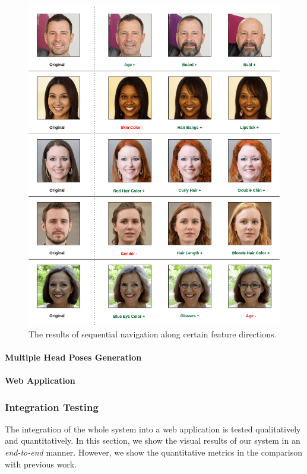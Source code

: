 \begin{figure}[H]
    \centering
    \includegraphics[width=\textwidth]{images/sequential-nav.png}
    \caption{The results of sequential navigation along certain feature directions.}
    \label{fig:nav_res}
\end{figure}

\paragraph{Multiple Head Poses Generation}

\paragraph{Web Application}

\subsubsection{Integration Testing}
The integration of the whole system into a web application is tested qualitatively and quantitatively. In this section, we show the visual results of our system in an \emph{end-to-end} manner. However, we show the quantitative metrics in the comparison with previous work. 

